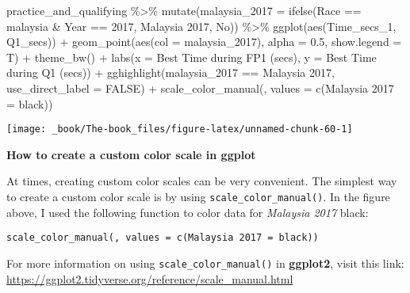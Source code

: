 \documentclass[
]{book}
\newenvironment{Shaded}{\begin{snugshade}}{\end{snugshade}}
\newcommand{\AttributeTok}[1]{\textcolor[rgb]{0.77,0.63,0.00}{#1}}
\newcommand{\ConstantTok}[1]{\textcolor[rgb]{0.00,0.00,0.00}{#1}}
\newcommand{\DecValTok}[1]{\textcolor[rgb]{0.00,0.00,0.81}{#1}}
\newcommand{\FloatTok}[1]{\textcolor[rgb]{0.00,0.00,0.81}{#1}}
\newcommand{\FunctionTok}[1]{\textcolor[rgb]{0.00,0.00,0.00}{#1}}
\newcommand{\NormalTok}[1]{#1}
\newcommand{\OtherTok}[1]{\textcolor[rgb]{0.56,0.35,0.01}{#1}}
\newcommand{\SpecialCharTok}[1]{\textcolor[rgb]{0.00,0.00,0.00}{#1}}
\newcommand{\StringTok}[1]{\textcolor[rgb]{0.31,0.60,0.02}{#1}}
\begin{document}
\begin{Shaded}
\begin{Highlighting}[]
\NormalTok{practice\_and\_qualifying }\SpecialCharTok{\%\textgreater{}\%}
  \FunctionTok{mutate}\NormalTok{(}\AttributeTok{malaysia\_2017 =} \FunctionTok{ifelse}\NormalTok{(Race }\SpecialCharTok{==} \StringTok{\textquotesingle{}malaysia\textquotesingle{}} \SpecialCharTok{\&}\NormalTok{ Year }\SpecialCharTok{==} \DecValTok{2017}\NormalTok{, }\StringTok{\textquotesingle{}Malaysia 2017\textquotesingle{}}\NormalTok{, }\StringTok{\textquotesingle{}No\textquotesingle{}}\NormalTok{)) }\SpecialCharTok{\%\textgreater{}\%} 
  \FunctionTok{ggplot}\NormalTok{(}\FunctionTok{aes}\NormalTok{(Time\_secs\_1, Q1\_secs)) }\SpecialCharTok{+}
  \FunctionTok{geom\_point}\NormalTok{(}\FunctionTok{aes}\NormalTok{(}\AttributeTok{col =}\NormalTok{ malaysia\_2017), }\AttributeTok{alpha =} \FloatTok{0.5}\NormalTok{, }\AttributeTok{show.legend =}\NormalTok{ T) }\SpecialCharTok{+}
  \FunctionTok{theme\_bw}\NormalTok{() }\SpecialCharTok{+}
  \FunctionTok{labs}\NormalTok{(}\AttributeTok{x =} \StringTok{\textquotesingle{}Best Time during FP1 (secs)\textquotesingle{}}\NormalTok{,}
       \AttributeTok{y =} \StringTok{\textquotesingle{}Best Time during Q1 (secs)\textquotesingle{}}\NormalTok{) }\SpecialCharTok{+}
  \FunctionTok{gghighlight}\NormalTok{(malaysia\_2017 }\SpecialCharTok{==} \StringTok{\textquotesingle{}Malaysia 2017\textquotesingle{}}\NormalTok{, }\AttributeTok{use\_direct\_label =} \ConstantTok{FALSE}\NormalTok{) }\SpecialCharTok{+}
  \FunctionTok{scale\_color\_manual}\NormalTok{(}\StringTok{\textquotesingle{}\textquotesingle{}}\NormalTok{, }\AttributeTok{values =} \FunctionTok{c}\NormalTok{(}\StringTok{\textquotesingle{}Malaysia 2017\textquotesingle{}} \OtherTok{=} \StringTok{\textquotesingle{}black\textquotesingle{}}\NormalTok{))}
\end{Highlighting}
\end{Shaded}

\begin{center}\texttt{[image: \_book/The-book\_files/figure-latex/unnamed-chunk-60-1]} \end{center}

\begin{blackbox}

\begin{center}
\textbf{How to create a custom color scale in ggplot}

\end{center}

At times, creating custom color scales can be very convenient. The simplest way to create a custom color scale is by using \texttt{scale\_color\_manual()}. In the figure above, I used the following function to color data for \emph{Malaysia 2017} black:

\texttt{scale\_color\_manual(\textquotesingle{}\textquotesingle{},\ values\ =\ c(\textquotesingle{}Malaysia\ 2017\textquotesingle{}\ =\ \textquotesingle{}black\textquotesingle{}))}

For more information on using \texttt{scale\_color\_manual()} in \textbf{ggplot2}, visit this link: \url{https://ggplot2.tidyverse.org/reference/scale_manual.html}

\end{blackbox}
\end{document}

